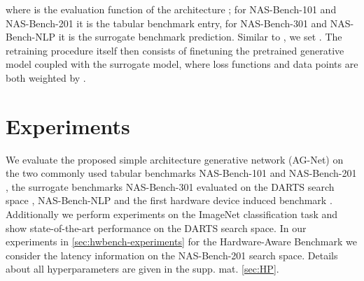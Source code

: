 \documentclass[runningheads]{llncs}
\begin{document}
where  is the evaluation function of the architecture ; for NAS-Bench-101 \cite{2019NB101} and NAS-Bench-201 \cite{2020NB201} it is the tabular benchmark entry, for NAS-Bench-301 \cite{2020NB301} and NAS-Bench-NLP \cite{2020NBNLP} it is the surrogate benchmark prediction.
Similar to \cite{2020Reweighting}, we set .
The retraining procedure itself then consists of finetuning the pretrained generative model coupled with the surrogate model, where loss functions and data points are both weighted by .



\section{Experiments}\label{sec:Experiments}
We evaluate the proposed simple architecture generative network (AG-Net) on the two commonly used tabular benchmarks NAS-Bench-101 \cite{2019NB101} and NAS-Bench-201 \cite{2020NB201}, the surrogate benchmarks NAS-Bench-301 \cite{2020NB301} evaluated on the DARTS search space \cite{2018DARTS}, NAS-Bench-NLP \cite{2020NBNLP} and the first hardware device induced benchmark \cite{2021HWNNB}. Additionally we perform experiments on the ImageNet \cite{2009ImageNet} classification task and show state-of-the-art performance on the DARTS search space. In our experiments in \autoref{sec:hwbench-experiments} for the Hardware-Aware Benchmark we consider the latency information on the NAS-Bench-201 search space. 
Details about all hyperparameters are given in the supp. mat. \autoref{sec:HP}. 
\end{document}

